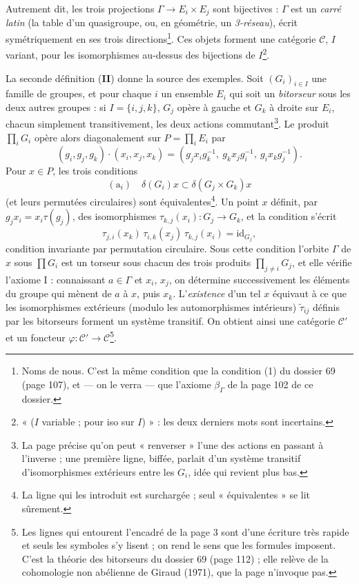 \documentclass[11pt,a4paper]{article}
\begin{document}
Autrement dit, les trois projections $\Gamma \to E_i \times E_j$ sont
bijectives : $\Gamma$ est un \emph{carré latin} (la table d'un quasigroupe,
ou, en géométrie, un \emph{3-réseau}), écrit symétriquement en ses trois
directions\footnote{Noms de nous. C'est la même condition que la condition (1)
du dossier 69 (page 107), et --- on le verra --- que l'axiome $\beta_\Gamma$
de la page 102 de ce dossier.}. Ces objets forment une catégorie
$\mathcal{C}$, $I$ variant, pour les isomorphismes au-dessus des bijections de
$I$\footnote{« ($I$ variable ; pour iso sur $I$) » : les deux derniers mots
sont incertains.}.

La seconde définition (\textbf{II}) donne la source des exemples. Soit
$(G_i)_{i\in I}$ une famille de groupes, et pour chaque $i$ un ensemble $E_i$
qui soit un \emph{bitorseur} sous les deux autres groupes : si $I = \lbrace
i, j, k\rbrace$, $G_j$ opère à gauche et $G_k$ à droite sur $E_i$, chacun
simplement transitivement, les deux actions commutant\footnote{La page
précise qu'on peut « renverser » l'une des actions en passant à l'inverse ;
une première ligne, biffée, parlait d'un système transitif d'isomorphismes
extérieurs entre les $G_i$, idée qui revient plus bas.}. Le produit $\prod_i
G_i$ opère alors diagonalement sur $P = \prod_i E_i$ par
\[
(g_i, g_j, g_k) \cdot (x_i, x_j, x_k) = (g_j x_i g_k^{-1},\ g_k x_j
g_i^{-1},\ g_i x_k g_j^{-1}).
\]
Pour $x \in P$, les trois conditions
\[
(\mathrm{a}_i) \quad \delta(G_i) x \subset \delta(G_j \times G_k) x
\]
(et leurs permutées circulaires) sont équivalentes\footnote{La ligne qui les
introduit est surchargée ; seul « équivalentes » se lit sûrement.}. Un point
$x$ définit, par $g_j x_i = x_i \tau(g_j)$, des isomorphismes
$\tau_{k,j}(x_i) : G_j \to G_k$, et la condition s'écrit
\[
\tau_{j,i}(x_k)\, \tau_{i,k}(x_j)\, \tau_{k,j}(x_i) = \mathrm{id}_{G_j},
\]
condition invariante par permutation circulaire. Sous cette condition l'orbite
$\Gamma$ de $x$ sous $\prod G_i$ est un torseur sous chacun des trois produits
$\prod_{j \neq i} G_j$, et elle vérifie l'axiome I : connaissant $a \in
\Gamma$ et $x_i$, $x_j$, on détermine successivement les éléments du groupe qui
mènent de $a$ à $x$, puis $x_k$. L'\emph{existence} d'un tel $x$ équivaut à ce
que les isomorphismes extérieurs (modulo les automorphismes intérieurs)
$\tilde\tau_{ij}$ définis par les bitorseurs forment un système transitif. On
obtient ainsi une catégorie $\mathcal{C}'$ et un foncteur $\varphi :
\mathcal{C}' \to \mathcal{C}$\footnote{Les lignes qui entourent l'encadré de
la page 3 sont d'une écriture très rapide et seuls les symboles s'y lisent ;
on rend le sens que les formules imposent. C'est la théorie des bitorseurs du
dossier 69 (page 112) ; elle relève de la cohomologie non abélienne de Giraud
(1971), que la page n'invoque pas.}.
\end{document}
